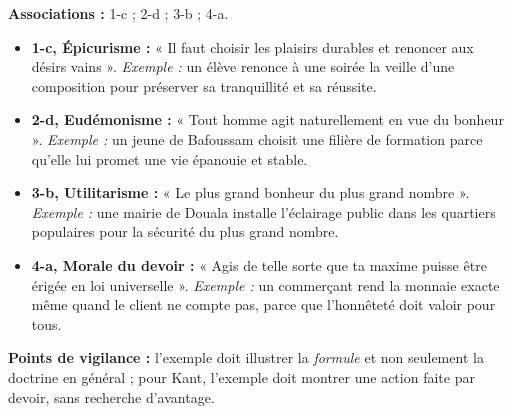 \documentclass[11pt]{article}
\begin{document}
\begin{corrige}
\textbf{Associations :} 1-c ; 2-d ; 3-b ; 4-a.
\begin{itemize}
\item \textbf{1-c, Épicurisme :} « Il faut choisir les plaisirs durables et renoncer aux désirs vains ». \emph{Exemple :} un élève renonce à une soirée la veille d'une composition pour préserver sa tranquillité et sa réussite.
\item \textbf{2-d, Eudémonisme :} « Tout homme agit naturellement en vue du bonheur ». \emph{Exemple :} un jeune de Bafoussam choisit une filière de formation parce qu'elle lui promet une vie épanouie et stable.
\item \textbf{3-b, Utilitarisme :} « Le plus grand bonheur du plus grand nombre ». \emph{Exemple :} une mairie de Douala installe l'éclairage public dans les quartiers populaires pour la sécurité du plus grand nombre.
\item \textbf{4-a, Morale du devoir :} « Agis de telle sorte que ta maxime puisse être érigée en loi universelle ». \emph{Exemple :} un commerçant rend la monnaie exacte même quand le client ne compte pas, parce que l'honnêteté doit valoir pour tous.
\end{itemize}
\textbf{Points de vigilance :} l'exemple doit illustrer la \emph{formule} et non seulement la doctrine en général ; pour Kant, l'exemple doit montrer une action faite par devoir, sans recherche d'avantage.
\end{corrige}
\end{document}
